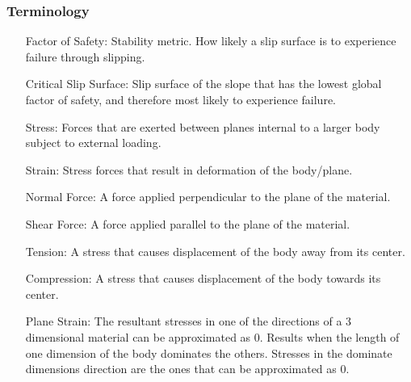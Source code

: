 \documentclass[12pt]{article}
\begin{document}
\subsubsection{Terminology}
\label{Sec:T}
\begin{itemize}
\item[Factor of Safety:]Stability metric. How likely a slip surface is to experience failure through slipping.
\item[Critical Slip Surface:]Slip surface of the slope that has the lowest global factor of safety, and therefore most likely to experience failure.
\item[Stress:]Forces that are exerted between planes internal to a larger body subject to external loading.
\item[Strain:]Stress forces that result in deformation of the body/plane.
\item[Normal Force:]A force applied perpendicular to the plane of the material.
\item[Shear Force:]A force applied parallel to the plane of the material.
\item[Tension:]A stress that causes displacement of the body away from its center.
\item[Compression:]A stress that causes displacement of the body towards its center.
\item[Plane Strain:]The resultant stresses in one of the directions of a 3 dimensional material can be approximated as 0. Results when the length of one dimension of the body dominates the others. Stresses in the dominate dimensions direction are the ones that can be approximated as 0.
\end{itemize}
\end{document}
